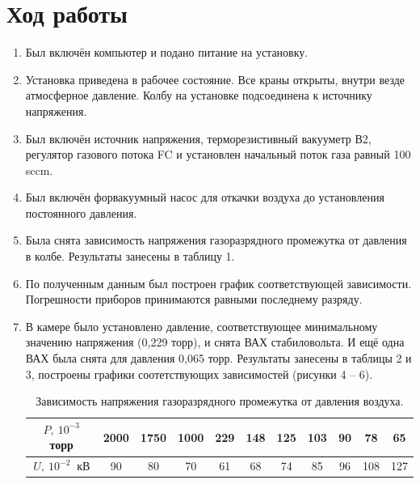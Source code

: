 \documentclass[12pt]{article}
\begin{document}
\section*{\textbf{Ход работы}}
\begin{enumerate}
    \item Был включён компьютер и подано питание на установку.
    \item Установка приведена в рабочее состояние. Все краны открыты, внутри везде атмосферное давление. Колбу на установке подсоединена к
источнику напряжения.

    \item Был включён источник напряжения, терморезистивный вакууметр В2,
регулятор газового потока FC и установлен начальный поток газа
равный 100 sccm.

    \item Был включён форвакуумный насос для откачки воздуха до установления постоянного давления.

    \item Была снята зависимость напряжения газоразрядного промежутка от
давления в колбе. Результаты занесены в таблицу 1.




\item По полученным данным был построен график соответствующей зависимости.
Погрешности приборов принимаются равными последнему
разряду.    %
	
\item В камере было установлено давление, соответствующее минимальному
значению напряжения (0,229 торр), и снята ВАХ стабиловольта. И ещё одна ВАХ была снята для давления 0,065 торр.
Результаты занесены в таблицы 2 и 3, построены графики соотетствующих
зависимостей (рисунки 4 -- 6).





\begin{table}[H]
\centering
\begin{tabular}{|c|c|c|c|c|c|c|c|c|c|c|}
\hline
$P,\ 10^{-3} $ торр & 2000 & 1750 & 1000 & 229 & 148 & 125 & 103 & 90 & 78  & 65  \\ \hline
$U,\ 10^{-2}\ $ кВ & 90   & 80   & 70   & 61  & 68  & 74  & 85  & 96 & 108 & 127 \\ \hline
\end{tabular}
\caption{Зависимость напряжения газоразрядного промежутка от давления воздуха.}
\label{table_air1}


\end{table}
\end{enumerate}
\end{document}

